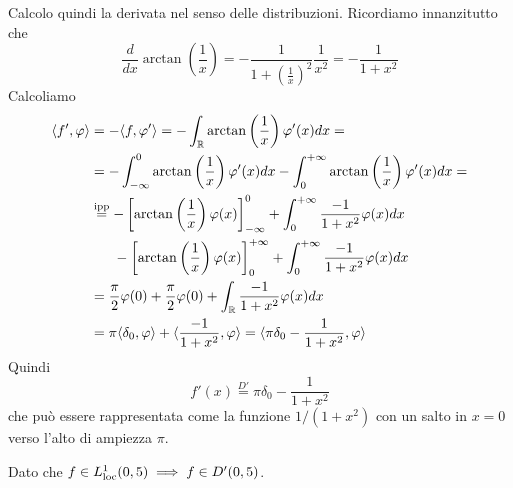 Calcolo quindi la derivata nel senso delle distribuzioni. Ricordiamo innanzitutto che
\begin{equation*}
\frac{d}{dx}\arctan\left(\frac{1}{x}\right) = - \frac{1}{1 + \left(\frac{1}{x}\right)^{2}}\frac{1}{x^{2}} = - \frac{1}{1 + x^{2}}
\end{equation*}
Calcoliamo
\begin{align*}
\langle f', \varphi \rangle & = - \langle f, \varphi'\rangle = - \int_{\mathbb{R}}\arctan\left(\frac{1}{x}\right) \varphi'(x)dx = \\
 & = - \int^{0}_{- \infty}\arctan\left(\frac{1}{x}\right) \varphi'(x)dx - \int^{+ \infty}_{0}\arctan\left(\frac{1}{x}\right) \varphi'(x)dx = \\
 & \overset{\text{ipp}}{=} - \left[\arctan\left(\frac{1}{x}\right) \varphi (x)\right]^{0}_{- \infty} + \int^{+ \infty}_{0}\frac{- 1}{1 + x^{2}} \varphi (x) dx\\
 & \ \ \ \ \ - \left[\arctan\left(\frac{1}{x}\right) \varphi (x)\right]^{+ \infty}_{0} + \int^{+ \infty}_{0}\frac{- 1}{1 + x^{2}} \varphi (x) dx\\
 & = \frac{\pi}{2} \varphi (0) + \frac{\pi}{2} \varphi (0) + \int_{\mathbb{R}}\frac{- 1}{1 + x^{2}} \varphi (x)dx\\
 & = \pi \langle \delta_{0}, \varphi \rangle + \langle \frac{- 1}{1 + x^{2}}, \varphi \rangle = \langle \pi \delta_{0} - \frac{1}{1 + x^{2}}, \varphi \rangle
\end{align*}
Quindi
\begin{equation*}
f'(x)\overset{D'}{=} \pi \delta_{0} - \frac{1}{1 + x^{2}}
\end{equation*}
che può essere rappresentata come la funzione $1/\left(1 + x^{2}\right)$ con un salto in $x = 0$ verso l'alto di ampiezza $\pi $.

\Soluzione

Dato che $f\in L^{1}_{\operatorname{loc}} (0, 5)\implies f\in D'(0, 5)$.


